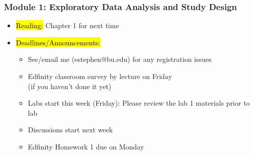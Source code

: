 
\begin{frame}
    \frametitle{Module 1: Exploratory Data Analysis and Study Design}
    \begin{itemize}
        \item \hl{Reading: }Chapter 1 for next time
        \item \hl{Deadlines/Announcements: }
        \begin{itemize}
            \item See/email me (estephen@bu.edu) for any registration issues
            \item Edfinity classroom survey by lecture on Friday \\
            (if you haven't done it yet)
            \item Labs start this week (Friday): Please review the lab 1 materials prior to lab
            \item Discussions start next week
            \item Edfinity Homework 1 due on Monday
        \end{itemize}
    \end{itemize}
    
\end{frame}
    
